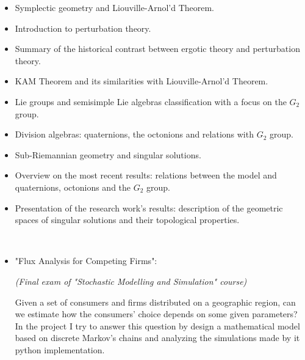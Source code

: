 \documentclass[10pt,a4paper]{altacv}
\begin{document}






\begin{itemize}
\item  Symplectic geometry and Liouville-Arnol'd Theorem.
\item Introduction to perturbation theory.
\item  Summary of the historical contrast between ergotic theory and perturbation theory. \item KAM Theorem and its similarities with Liouville-Arnol'd Theorem.
\end{itemize}

\begin{itemize}
\item Lie groups and semisimple Lie algebras classification with a focus on the $G_2$ group.
\item Division algebras: quaternions, the octonions and relations with $G_2$ group.
\item Sub-Riemannian geometry and  singular solutions.
\item Overview on the most recent results: relations between the model and quaternions, octonions and the $G_2$ group.  

\item Presentation of the research work's results: description of the geometric spaces of singular solutions and their topological properties.

\end{itemize}
	
\
\\


\begin{itemize}
\item "Flux Analysis for Competing Firms": 

\textit{(Final exam of "Stochastic Modelling and Simulation" course)}

Given a set of consumers and firms distributed on a geographic region, can we estimate how the consumers' choice depends on some given parameters? In the project I try to answer this question by design a mathematical model based on discrete Markov's chains and analyzing the simulations made by it python implementation.
\end{itemize}
\end{document}
